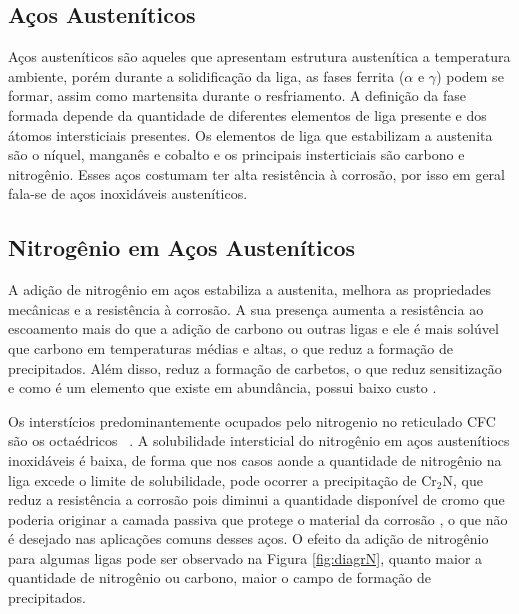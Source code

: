 \documentclass[]{politex}
\begin{document}
\subsection{Aços Austeníticos}
	Aços austeníticos são aqueles que apresentam estrutura austenítica a temperatura ambiente, porém durante a solidificação da liga, as fases ferrita ($\alpha$ e $\gamma$) podem se formar, assim como martensita durante o resfriamento. A definição da fase formada depende da quantidade de diferentes elementos de liga presente e dos átomos intersticiais presentes. Os elementos de liga que estabilizam a austenita são o níquel, manganês e cobalto e os principais insterticiais são carbono e nitrogênio.
	Esses aços costumam ter alta resistência à corrosão, por isso em geral fala-se de aços inoxidáveis austeníticos.

\subsection{Nitrogênio em Aços Austeníticos}
	A adição de nitrogênio em aços estabiliza a austenita, melhora as propriedades mecânicas e a resistência à corrosão. A sua presença aumenta a resistência ao escoamento mais do que a adição de carbono ou outras ligas e ele é mais solúvel que carbono em temperaturas médias e altas, o que reduz a formação de precipitados. Além disso, reduz a formação de carbetos, o que reduz sensitização e como é um elemento que existe em abundância, possui baixo custo \cite{reed1989nitrogen}.\par
	Os interstícios predominantemente ocupados pelo nitrogenio no reticulado CFC são os octaédricos ~\cite{christiansen2006controlled}. A solubilidade intersticial do nitrogênio em aços austenítiocs inoxidáveis é baixa, de forma que nos casos aonde a quantidade de nitrogênio na liga excede o limite de solubilidade, pode ocorrer a precipitação de Cr$_{2}$N, que reduz a resistência a corrosão pois diminui a quantidade disponível de cromo que poderia originar a camada passiva que protege o material da corrosão \cite{somers2018expanded}, o que não é desejado nas aplicações comuns desses aços. O efeito da adição de nitrogênio para algumas ligas pode ser observado na Figura \ref{fig:diagrN}, quanto maior a quantidade de nitrogênio ou carbono, maior o campo de formação de precipitados.\par
	
\end{document}
